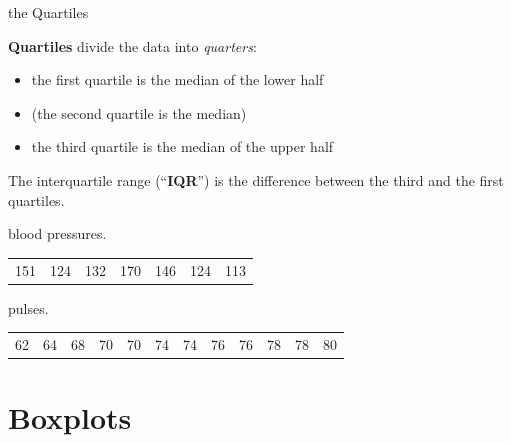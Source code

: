 \begin{frame}{the Quartiles}

    \textbf{Quartiles} divide the data into \emph{quarters}:
    \begin{itemize}
        \item the \alert{first quartile} is the median of the {lower half}
        \item (the \alert{second quartile} is the median)
        \item the \alert{third quartile} is the median of the {upper half}
    \end{itemize}

    \vspace{2em}

    The \alert{interquartile range} (``\textbf{IQR}'') is the difference between the third and the first quartiles.

    \pause
    \vspace{2em}

     blood pressures.
    \begin{center}
        \begin{tabular}{ccccccc}
            151 & 124 & 132 & 170 & 146 & 124 & 113
        \end{tabular}
    \end{center}

    \pause
    \vspace{2em}

     pulses.
    \begin{center}
        \begin{tabular}{cccccccccccc}
            62 & 64 & 68 & 70 & 70 & 74 & 74 & 76 & 76 & 78 & 78 & 80 
        \end{tabular}
    \end{center}

\end{frame}


\section{Boxplots}

